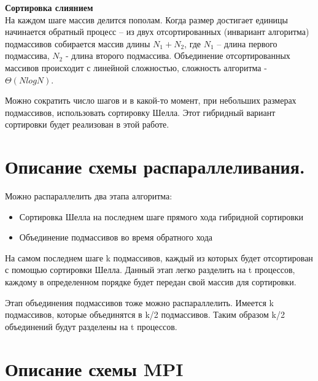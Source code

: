 \documentclass[14pt, a4paper]{extarticle}
\begin{document}
        \textbf{Сортировка слиянием }\\
        На каждом шаге массив делится пополам. Когда размер достигает единицы начинается обратный процесс – из двух отсортированных (инвариант алгоритма) 
        подмассивов собирается массив длины $N_1 + N_2$, где $N_1$ – длина первого подмассива, $N_2$ - длина второго подмассива. 
        Объединение отсортированных массивов происходит с линейной сложностью, сложность алгоритма - $\Theta(NlogN)$.
        
        Можно сократить число шагов и в какой-то момент, при небольших размерах подмассивов, использовать сортировку Шелла. Этот гибридный вариант сортировки будет реализован в этой работе.

	\newpage

	\section{Описание схемы распараллеливания.}
	Можно распараллелить два этапа алгоритма:
        \begin{itemize}
		\item Сортировка Шелла на последнем шаге прямого хода гибридной сортировки
            \item Объединение подмассивов во время обратного хода
        \end{itemize}

        На самом последнем шаге k подмассивов, каждый из которых будет отсортирован с помощью сортировки Шелла. Данный этап легко разделить на t процессов, каждому в определенном порядке будет передан свой массив для сортировки.

        Этап объединения подмассивов тоже можно распараллелить. Имеется k подмассивов, которые объединятся в k/2 подмассивов. Таким образом k/2 
        объединений будут разделены на t процессов.

	\newpage

	\section{Описание схемы MPI}
\end{document}
